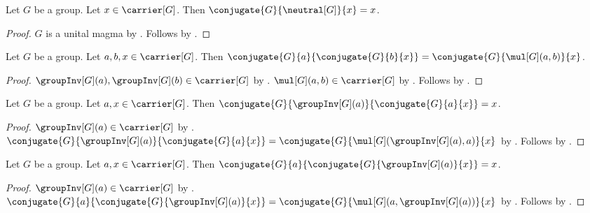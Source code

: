 \begin{proposition}\label{group_conjugate_by_neutral}
    Let $G$ be a group.
    Let $x\in\carrier[G]$.
    Then $\conjugate{G}{\neutral[G]}{x}=x$.
\end{proposition}
\begin{proof}
    $G$ is a unital magma by
        .
    Follows by
        .
\end{proof}

\begin{theorem}\label{group_conjugate_composition}
    Let $G$ be a group.
    Let $a,b,x\in\carrier[G]$.
    Then
        $\conjugate{G}{a}{\conjugate{G}{b}{x}}
            =\conjugate{G}{\mul[G](a,b)}{x}$.
\end{theorem}
\begin{proof}
    $\groupInv[G](a),\groupInv[G](b)\in\carrier[G]$ by
        .
    $\mul[G](a,b)\in\carrier[G]$ by
        .
    Follows by
        .
\end{proof}

\begin{corollary}\label{group_conjugate_inverse_left}
    Let $G$ be a group.
    Let $a,x\in\carrier[G]$.
    Then
        $\conjugate{G}{\groupInv[G](a)}{\conjugate{G}{a}{x}}=x$.
\end{corollary}
\begin{proof}
    $\groupInv[G](a)\in\carrier[G]$ by
        .
    $\conjugate{G}{\groupInv[G](a)}{\conjugate{G}{a}{x}}
        =\conjugate{G}
            {\mul[G](\groupInv[G](a),a)}{x}$ by
        .
    Follows by
        .
\end{proof}

\begin{corollary}\label{group_conjugate_inverse_right}
    Let $G$ be a group.
    Let $a,x\in\carrier[G]$.
    Then
        $\conjugate{G}{a}{\conjugate{G}{\groupInv[G](a)}{x}}=x$.
\end{corollary}
\begin{proof}
    $\groupInv[G](a)\in\carrier[G]$ by
        .
    $\conjugate{G}{a}{\conjugate{G}{\groupInv[G](a)}{x}}
        =\conjugate{G}
            {\mul[G](a,\groupInv[G](a))}{x}$ by
        .
    Follows by
        .
\end{proof}

